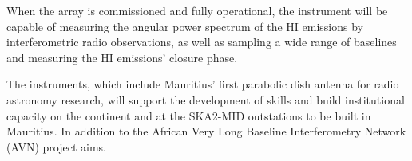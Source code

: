 {%



When the array is commissioned and fully operational, the instrument will be capable of measuring the angular power spectrum of the HI emissions by interferometric radio observations, as well as sampling a wide range of baselines and measuring the HI emissions' closure phase.


The instruments, which include Mauritius' first parabolic dish antenna for radio astronomy research, will support the development of skills and build institutional capacity on the continent and at the SKA2-MID outstations to be built in Mauritius. In addition to the African Very Long Baseline Interferometry Network (AVN) project aims.
\cite{copley2016african} %
    
    
}
    
    
